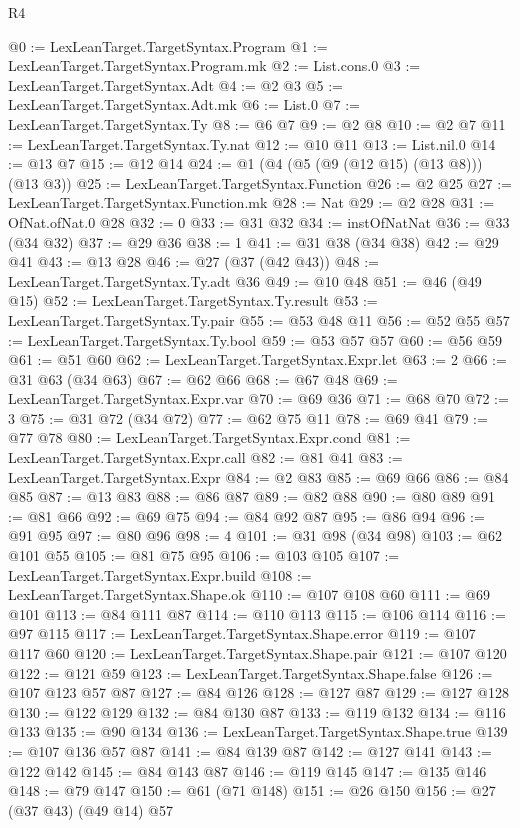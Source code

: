 \begin{lexlean}{R4}
\begin{coremodule}
{{{{{{{{{{{{{{@0 := LexLeanTarget.TargetSyntax.Program
@1 := LexLeanTarget.TargetSyntax.Program.mk
@2 := List.cons.{0}
@3 := LexLeanTarget.TargetSyntax.Adt
@4 := @2 @3
@5 := LexLeanTarget.TargetSyntax.Adt.mk
@6 := List.{0}
@7 := LexLeanTarget.TargetSyntax.Ty
@8 := @6 @7
@9 := @2 @8
@10 := @2 @7
@11 := LexLeanTarget.TargetSyntax.Ty.nat
@12 := @10 @11
@13 := List.nil.{0}
@14 := @13 @7
@15 := @12 @14
@24 := @1 (@4 (@5 (@9 (@12 @15) (@13 @8))) (@13 @3))
@25 := LexLeanTarget.TargetSyntax.Function
@26 := @2 @25
@27 := LexLeanTarget.TargetSyntax.Function.mk
@28 := Nat
@29 := @2 @28
@31 := OfNat.ofNat.{0} @28
@32 := 0
@33 := @31 @32
@34 := instOfNatNat
@36 := @33 (@34 @32)
@37 := @29 @36
@38 := 1
@41 := @31 @38 (@34 @38)
@42 := @29 @41
@43 := @13 @28
@46 := @27 (@37 (@42 @43))
@48 := LexLeanTarget.TargetSyntax.Ty.adt @36
@49 := @10 @48
@51 := @46 (@49 @15)
@52 := LexLeanTarget.TargetSyntax.Ty.result
@53 := LexLeanTarget.TargetSyntax.Ty.pair
@55 := @53 @48 @11
@56 := @52 @55
@57 := LexLeanTarget.TargetSyntax.Ty.bool
@59 := @53 @57 @57
@60 := @56 @59
@61 := @51 @60
@62 := LexLeanTarget.TargetSyntax.Expr.let
@63 := 2
@66 := @31 @63 (@34 @63)
@67 := @62 @66
@68 := @67 @48
@69 := LexLeanTarget.TargetSyntax.Expr.var
@70 := @69 @36
@71 := @68 @70
@72 := 3
@75 := @31 @72 (@34 @72)
@77 := @62 @75 @11
@78 := @69 @41
@79 := @77 @78
@80 := LexLeanTarget.TargetSyntax.Expr.cond
@81 := LexLeanTarget.TargetSyntax.Expr.call
@82 := @81 @41
@83 := LexLeanTarget.TargetSyntax.Expr
@84 := @2 @83
@85 := @69 @66
@86 := @84 @85
@87 := @13 @83
@88 := @86 @87
@89 := @82 @88
@90 := @80 @89
@91 := @81 @66
@92 := @69 @75
@94 := @84 @92 @87
@95 := @86 @94
@96 := @91 @95
@97 := @80 @96
@98 := 4
@101 := @31 @98 (@34 @98)
@103 := @62 @101 @55
@105 := @81 @75 @95
@106 := @103 @105
@107 := LexLeanTarget.TargetSyntax.Expr.build
@108 := LexLeanTarget.TargetSyntax.Shape.ok
@110 := @107 @108 @60
@111 := @69 @101
@113 := @84 @111 @87
@114 := @110 @113
@115 := @106 @114
@116 := @97 @115
@117 := LexLeanTarget.TargetSyntax.Shape.error
@119 := @107 @117 @60
@120 := LexLeanTarget.TargetSyntax.Shape.pair
@121 := @107 @120
@122 := @121 @59
@123 := LexLeanTarget.TargetSyntax.Shape.false
@126 := @107 @123 @57 @87
@127 := @84 @126
@128 := @127 @87
@129 := @127 @128
@130 := @122 @129
@132 := @84 @130 @87
@133 := @119 @132
@134 := @116 @133
@135 := @90 @134
@136 := LexLeanTarget.TargetSyntax.Shape.true
@139 := @107 @136 @57 @87
@141 := @84 @139 @87
@142 := @127 @141
@143 := @122 @142
@145 := @84 @143 @87
@146 := @119 @145
@147 := @135 @146
@148 := @79 @147
@150 := @61 (@71 @148)
@151 := @26 @150
@156 := @27 (@37 @43) (@49 @14) @57
}}}}}}}}}}}}}}
\end{coremodule}
\end{lexlean}
